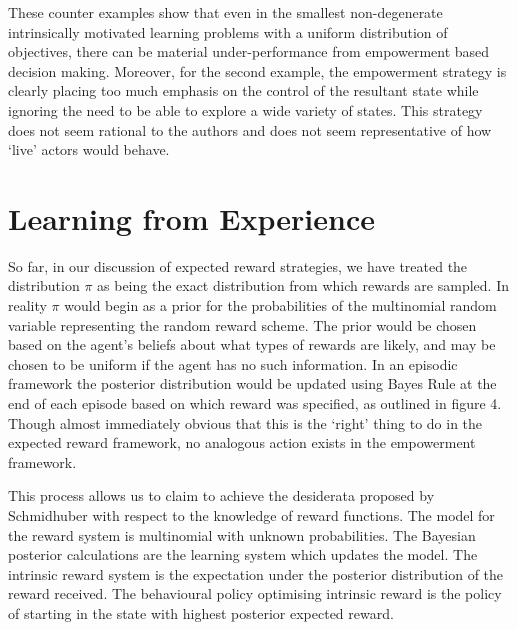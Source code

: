 \documentclass{article}
\begin{document}
These counter examples show that even in the smallest non-degenerate intrinsically motivated learning problems with a uniform distribution of objectives, there can be material under-performance from empowerment based decision making. Moreover, for the second example, the empowerment strategy is clearly placing too much emphasis on the control of the resultant state while ignoring the need to be able to explore a wide variety of states. This strategy does not seem rational to the authors and does not seem representative of how `live' actors would behave.

\section{Learning from Experience}
So far, in our discussion of expected reward strategies, we have treated the distribution $\pi$ as being the exact distribution from which rewards are sampled. In reality $\pi$ would begin as a prior for the probabilities of the multinomial random variable representing the random reward scheme. The prior would be chosen based on the agent's beliefs about what types of rewards are likely, and may be chosen to be uniform if the agent has no such information. In an episodic framework the posterior distribution would be updated using Bayes Rule at the end of each episode based on which reward was specified, as outlined in figure 4. Though almost immediately obvious that this is the `right' thing to do in the expected reward framework, no analogous action exists in the empowerment framework. 

This process allows us to claim to achieve the desiderata proposed by Schmidhuber with respect to the knowledge of reward functions. The model for the reward system is multinomial with unknown probabilities. The Bayesian posterior calculations are the learning system which updates the model. The intrinsic reward system is the expectation under the posterior distribution of the reward received. The behavioural policy optimising intrinsic reward is the policy of starting in the state with highest posterior expected reward.
\end{document}
